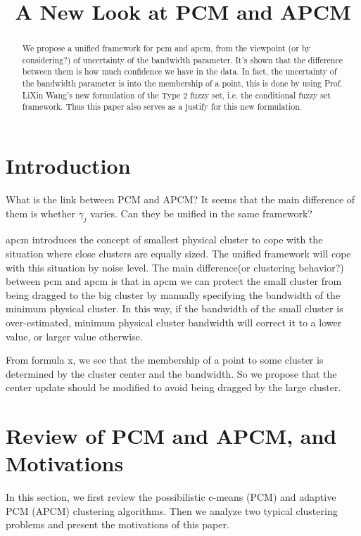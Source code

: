 \documentclass[journal]{IEEEtran}
\date{}
\title{A New Look at PCM and APCM}
\theoremstyle{definition}
\begin{document}
\maketitle
\begin{abstract}
We propose a unified framework for pcm and apcm, from the viewpoint (or by considering?) of uncertainty of the bandwidth parameter. It's shown that the difference between them is how much confidence we have in the data. In fact, the uncertainty of the bandwidth parameter is into the membership of  a point, this is done by using Prof. LiXin Wang's new formulation of the Type 2 fuzzy set, i.e. the conditional fuzzy set framework. Thus this paper also serves as a justify for this new formulation.
\end{abstract}

\section{Introduction}
\label{sec-1}

What is the link between PCM and APCM?
It seems that the main difference of them is whether $\gamma_j$ varies. Can they be unified in the same framework?

apcm introduces the concept of smallest physical cluster to cope with the situation where close clusters are equally sized. The unified framework will cope with this situation by noise level.
The main difference(or clustering behavior?) between pcm and apcm is that in apcm we can protect the small cluster from being dragged to the big cluster by manually specifying the bandwidth of the  minimum physical cluster. In this way, if the bandwidth of the small cluster is over-estimated, minimum physical cluster bandwidth will correct it to a lower value, or larger value otherwise.

From formula x, we see that the membership of a point to some cluster is determined by the cluster center and the bandwidth. So we propose that the center update should be modified to avoid being dragged by the large cluster.

\section{Review of PCM and APCM, and Motivations}
\label{sec-2}
In this section, we first review the possibilistic c-means (PCM) and adaptive PCM (APCM) clustering algorithms. Then we analyze two typical clustering problems and present the motivations of this paper.
\end{document}
